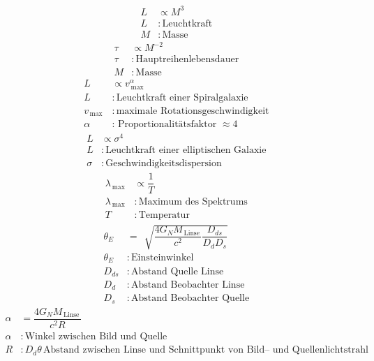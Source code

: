 \documentclass[a4paper,12pt]{article}
\numberwithin{equation}{section}
\begin{document}
\begin{align} 
        L&\propto M^3\\
        L&:\,\text{Leuchtkraft}\,\nonumber \\
        M&:\,\text{Masse}\,\nonumber 
\end{align} 
\begin{align} 
        \tau &\propto M^{-2}\\
        \tau &:\,\text{Hauptreihenlebensdauer}\,\nonumber \\
        M&:\,\text{Masse}\,\nonumber 
\end{align} 
\begin{align} 
        L&\propto v_{\,\text{max}\,}^\alpha \label{eq:TFR}\\
        L&:\,\text{Leuchtkraft einer Spiralgalaxie}\,\nonumber \\
        v_{\,\text{max}\,}&:\,\text{maximale Rotationsgeschwindigkeit}\,\nonumber \\
        \alpha &:\,\text{Proportionalitätsfaktor $\approx 4$}\,\nonumber 
\end{align} 
\begin{align} 
        L&\propto \sigma ^4\label{eq:FJR}\\
        L&:\,\text{Leuchtkraft einer elliptischen Galaxie}\,\nonumber \\
        \sigma &:\,\text{Geschwindigkeitsdispersion}\,\nonumber 
\end{align} 
\begin{align} 
        \lambda _{\,\text{max}\,}&\propto \dfrac{1}{T}\\
        \lambda _{\,\text{max}\,}&:\,\text{Maximum des Spektrums}\,\nonumber \\
        T&:\,\text{Temperatur}\,\nonumber 
\end{align} 
\begin{align} 
        \theta _E&=\,\sqrt[]{\dfrac{4G_NM_{\,\text{Linse}\,}}{c^2}\dfrac{D_{ds}}{D_dD_s}}\label{eq:Einsteinwinkel}\\
        \theta _E&:\,\text{Einsteinwinkel}\,\nonumber \\
        D_{ds}&:\,\text{Abstand Quelle Linse}\,\nonumber \\
        D_d&:\,\text{Abstand Beobachter Linse}\,\nonumber \\
        D_s&:\,\text{Abstand Beobachter Quelle}\,\nonumber 
\end{align} 
\begin{align} 
        \alpha &=\dfrac{4G_NM_{\,\text{Linse}\,}}{c^2R}\\
        \alpha &:\,\text{Winkel zwischen Bild und Quelle}\,\nonumber \\
        R&:D_d\theta \,\text{Abstand zwischen Linse und Schnittpunkt von Bild-- und Quellenlichtstrahl}\,\nonumber 
\end{align} 
\end{document}
